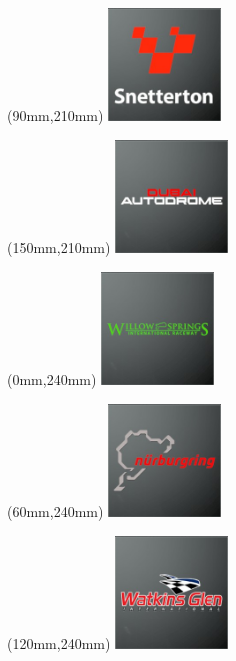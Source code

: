 \begin{textblock*}{30mm}(90mm,210mm)%
\includegraphics[width=30mm]{LG/2015-05-20_00095.png}
\end{textblock*}
\begin{textblock*}{30mm}(150mm,210mm)%
\includegraphics[width=30mm]{LG/2015-05-20_00081.png}
\end{textblock*}
\begin{textblock*}{30mm}(0mm,240mm)%
\includegraphics[width=30mm]{LG/2015-05-20_00098.png}
\end{textblock*}
\begin{textblock*}{30mm}(60mm,240mm)%
\includegraphics[width=30mm]{LG/2015-05-20_00089.png}
\end{textblock*}
\begin{textblock*}{30mm}(120mm,240mm)%
\includegraphics[width=30mm]{LG/2015-05-20_00097.png}
\end{textblock*}
